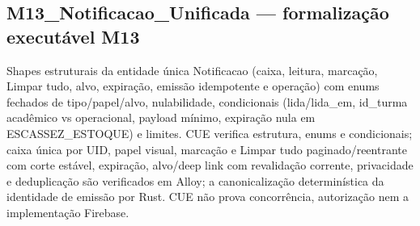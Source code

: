 \subsection*{M13\_Notificacao\_Unificada --- formalização executável M13}
Shapes estruturais da entidade única Notificacao (caixa, leitura, marcação, Limpar tudo, alvo, expiração, emissão idempotente e operação) com enums fechados de tipo/papel/alvo, nulabilidade, condicionais (lida/lida\_em, id\_turma acadêmico vs operacional, payload mínimo, expiração nula em ESCASSEZ\_ESTOQUE) e limites. CUE verifica estrutura, enums e condicionais; caixa única por UID, papel visual, marcação e Limpar tudo paginado/reentrante com corte estável, expiração, alvo/deep link com revalidação corrente, privacidade e deduplicação são verificados em Alloy; a canonicalização determinística da identidade de emissão por Rust. CUE não prova concorrência, autorização nem a implementação Firebase.
